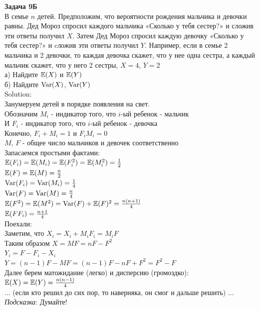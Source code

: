 \documentclass[12pt, a4paper]{article}\usepackage[]{graphicx}\usepackage[]{color}
\begin{document}
	\textbf{Задача 9Б} \\
	В семье $n$ детей. Предположим, что вероятности рождения мальчика и девочки равны. Дед Мороз спросил каждого мальчика «Сколько у тебя сестер?» и сложив эти ответы получил $X$. Затем Дед Мороз спросил каждую девочку «Сколько у тебя сестер?» и cложив эти ответы получил $Y$. Например, если в семье 2 мальчика и 2 девочки, то каждая девочка скажет, что у нее одна сестра, а каждый мальчик скажет, что у него 2 сестры, $X=4$, $Y=2$ \\
	а) Найдите $\mathbb{E}(X)$ и $\mathbb{E}(Y)$ \\
	б) Найдите $\operatorname{Var}(X)$, $\operatorname{Var}(Y)$ \\
	Solution: \\
	Занумеруем детей в порядке появления на свет. \\
	Обозначим $M_{i}$ - индикатор того, что $i$-ый ребенок - мальчик \\
	И $F_{i}$ - индикатор того, что $i$-ый ребенок - девочка \\
	Конечно, $F_{i}+M_{i}=1$ и $F_{i}M_{i}=0$ \\
	$M$, $F$ - общее число мальчиков и девочек соответственно \\
	Запасаемся простыми фактами: \\
	$\mathbb{E}(F_{i})=\mathbb{E}(M_{i})=\mathbb{E}(F_{i}^{2})=\mathbb{E}(M_{i}^{2})=\frac{1}{2}$ \\
	$\mathbb{E}(F)=\mathbb{E}(M)=\frac{n}{2}$ \\
	$\operatorname{Var}(F_{i})=\operatorname{Var}(M_{i})=\frac{1}{4}$ \\
	$\operatorname{Var}(F)=\operatorname{Var}(M)=\frac{n}{4}$ \\
	$\mathbb{E}(F^{2})=\mathbb{E}(M^{2})=\operatorname{Var}(F)+\mathbb{E}(F)^{2}=\frac{n(n+1)}{4}$ \\
	$\mathbb{E}(FF_{i})=\frac{n+1}{4}$ \\
	Поехали: \\
	Заметим, что $X_{i}=X_{i}+M_{i}F_{i}=M_{i}F$ \\
	Таким образом $X=MF=nF-F^{2}$ \\
	$Y_{i}=F-F_{i}-X_{i}$ \\
	$Y=(n-1)F-MF=(n-1)F-nF+F^{2}=F^{2}-F$ \\
	Далее берем матожидание (легко) и дисперсию (громоздко): \\
	$\mathbb{E}(X)=\mathbb{E}(Y)=\frac{n(n-1)}{4}$ \\
	... (если кто решил до сих пор, то наверняка, он смог и дальше решить) ...\\


	\emph{Подсказка}: Думайте! \\
\end{document}
